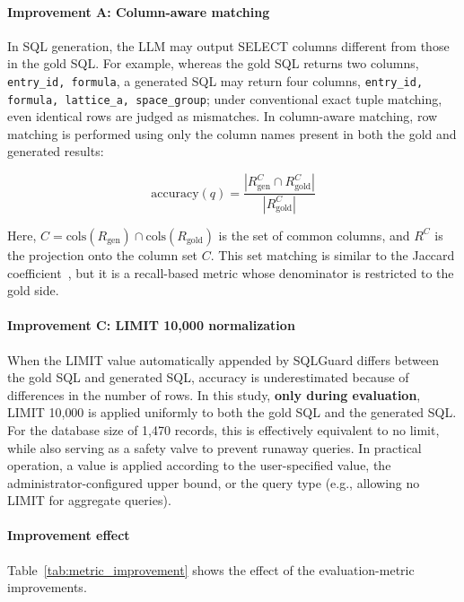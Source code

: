 \documentclass[5p,twocolumn]{elsarticle}
\begin{document}
\paragraph{Improvement A: Column-aware matching}
In SQL generation, the LLM may output SELECT columns different from those in the gold SQL.
For example, whereas the gold SQL returns two columns, \texttt{entry\_id, formula},
a generated SQL may return four columns, \texttt{entry\_id, formula, lattice\_a, space\_group};
under conventional exact tuple matching, even identical rows are judged as mismatches.
In column-aware matching, row matching is performed using only the column names present in both the gold and generated results:

\begin{equation}
  \text{accuracy}(q) = \frac{|R_\text{gen}^{C} \cap R_\text{gold}^{C}|}{|R_\text{gold}^{C}|}
  \label{eq:column_aware}
\end{equation}

Here, $C = \text{cols}(R_\text{gen}) \cap \text{cols}(R_\text{gold})$ is
the set of common columns, and $R^C$ is the projection onto the column set $C$.
This set matching is similar to the Jaccard coefficient~\citep{jaccard1912distribution},
but it is a recall-based metric whose denominator is restricted to the gold side.

\paragraph{Improvement C: LIMIT 10{,}000 normalization}
When the LIMIT value automatically appended by SQLGuard differs between the gold SQL and generated SQL,
accuracy is underestimated because of differences in the number of rows.
In this study, \textbf{only during evaluation}, LIMIT 10{,}000 is applied uniformly to both the gold SQL and the generated SQL.
For the database size of 1{,}470 records, this is effectively equivalent to no limit, while also
serving as a safety valve to prevent runaway queries.
In practical operation, a value is applied according to the user-specified value, the administrator-configured upper bound, or the query type
(e.g., allowing no LIMIT for aggregate queries).

\paragraph{Improvement effect}
Table~\ref{tab:metric_improvement} shows the effect of the evaluation-metric improvements.
\end{document}
